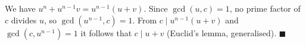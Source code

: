 We have $u^n+u^{n-1}v=u^{n-1}(u+v)$. Since $\gcd(u,c)=1$, no prime factor of $c$ divides $u$, so $\gcd(u^{n-1},c)=1$. From $c\mid u^{n-1}(u+v)$ and $\gcd(c,u^{n-1})=1$ it follows that $c\mid u+v$ (Euclid's lemma, generalised). $\blacksquare$
